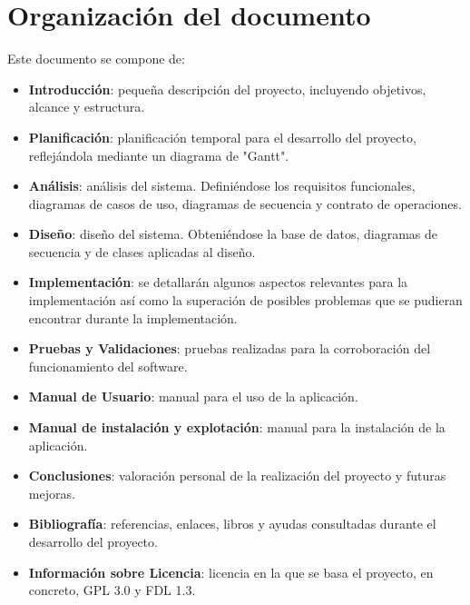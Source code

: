 \section{Organización del documento}
Este documento se compone de:
\begin{itemize}
\item \textbf{Introducción}: pequeña descripción del proyecto, incluyendo objetivos, alcance y estructura.
\item \textbf{Planificación}: planificación temporal para el desarrollo del proyecto, reflejándola mediante un diagrama de "Gantt".
\item \textbf{Análisis}: análisis del sistema. Definiéndose los requisitos funcionales, diagramas de casos de uso, diagramas de secuencia y contrato de operaciones.
\item \textbf{Diseño}: diseño del sistema. Obteniéndose la base de datos, diagramas de secuencia y de clases aplicadas al diseño.
\item \textbf{Implementación}: se detallarán algunos aspectos relevantes para la implementación así como la superación de posibles problemas que se pudieran encontrar durante la implementación.
\item \textbf{Pruebas y Validaciones}: pruebas realizadas para la corroboración del funcionamiento del software.
\item \textbf{Manual de Usuario}: manual para el uso de la aplicación.
\item \textbf{Manual de instalación y explotación}: manual para la instalación de la aplicación. 
\item \textbf{Conclusiones}: valoración personal de la realización del proyecto y futuras mejoras.
\item \textbf{Bibliografía}: referencias, enlaces, libros y ayudas consultadas durante el desarrollo del proyecto.
\item \textbf{Información sobre Licencia}: licencia en la que se basa el proyecto, en concreto, GPL 3.0 y FDL 1.3.
\end{itemize}





